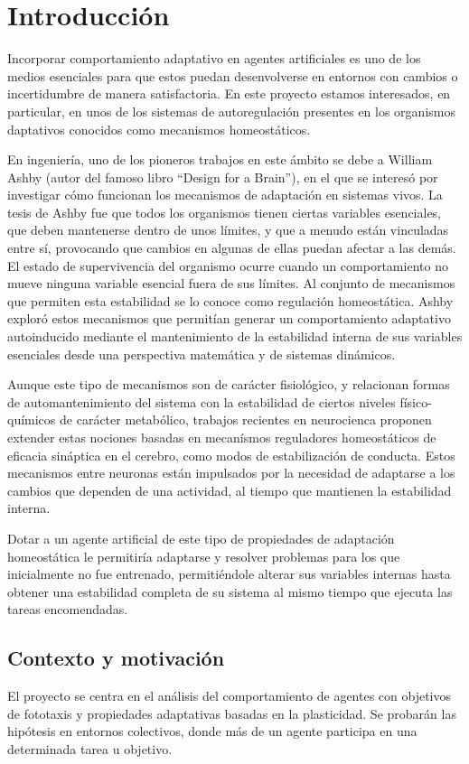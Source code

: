 \chapter{Introducción}
Incorporar comportamiento adaptativo en agentes artificiales es uno de los medios esenciales para que estos puedan desenvolverse en entornos con cambios o incertidumbre de manera satisfactoria. En este proyecto
estamos interesados, en particular, en unos de los sistemas de autoregulación presentes en los organismos daptativos conocidos como mecanismos homeostáticos.

En ingeniería, uno de los pioneros trabajos en este ámbito se debe a William Ashby (autor del famoso libro ``Design for a Brain''\cite{Ashby}), en el que se interesó por investigar cómo funcionan los mecanismos de
adaptación en sistemas vivos. La tesis de Ashby fue que todos los organismos tienen ciertas variables esenciales, que deben mantenerse dentro de unos límites, y que a menudo están
vinculadas entre sí, provocando que cambios en algunas de ellas puedan afectar a las demás. El estado de supervivencia del organismo ocurre cuando un comportamiento no mueve ninguna variable esencial
fuera de sus límites. Al conjunto de mecanismos que permiten esta estabilidad se lo conoce como regulación homeostática. Ashby exploró estos mecanismos que permitían generar un comportamiento adaptativo
autoinducido mediante el mantenimiento de la estabilidad interna de sus variables esenciales desde una perspectiva matemática y de sistemas dinámicos.

Aunque este tipo de mecanismos son de carácter fisiológico, y relacionan formas de automantenimiento del sistema con la estabilidad de ciertos niveles físico-químicos de carácter metabólico, trabajos recientes
en neurocienca proponen extender estas nociones basadas en mecanísmos reguladores homeostáticos de eficacia sináptica en el cerebro, como modos de estabilización de conducta. Estos mecanismos entre neuronas están
impulsados por la necesidad de adaptarse a los cambios que dependen de una actividad, al tiempo que mantienen la estabilidad interna.

Dotar a un agente artificial de este tipo de propiedades de adaptación homeostática le permitiría adaptarse y resolver problemas para los que inicialmente no fue entrenado, permitiéndole alterar sus variables
internas hasta obtener una estabilidad completa de su sistema al mismo tiempo que ejecuta las tareas encomendadas.

\section{Contexto y motivación}
El proyecto se centra en el análisis del comportamiento de agentes con objetivos de fototaxis y propiedades adaptativas basadas en la plasticidad. Se probarán las hipótesis en entornos colectivos, donde más de un agente
participa en una determinada tarea u objetivo.

